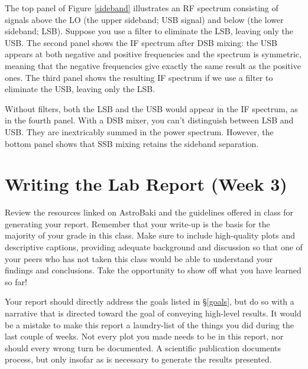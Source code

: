\documentclass[11pt,preprint]{aastex}
\begin{document}
%
%
%
The top panel of Figure \ref{sideband} illustrates an
RF spectrum consisting of signals above the LO (the upper
sideband; USB
signal) and below (the lower sideband; LSB). Suppose you use a filter to
eliminate the LSB, leaving only the USB. The second panel
shows the IF spectrum after DSB mixing: the USB appears at both negative
and positive frequencies and the spectrum is symmetric, meaning that the
negative frequencies give exactly the same result as the positive ones.
The third panel shows the resulting IF spectrum if we use a filter to eliminate the USB, leaving only the LSB.

Without filters, both the LSB and the USB
would appear in the IF spectrum, as in the fourth panel. 
With a DSB mixer, you can't distinguish between LSB and
USB. They are inextricably
summed in the power spectrum.
However, the bottom panel shows that SSB 
mixing retains the sideband separation.

\section{Writing the Lab Report (Week 3)} \label{report}

\noindent
Review the resources linked on AstroBaki and the guidelines
offered in class for generating your report. Remember that your write-up
is the basis for the majority of your grade in this class. Make sure to
include high-quality plots and descriptive captions, providing adequate background
and discussion so that one of your peers who has not taken this class would
be able to understand your findings and conclusions. Take the opportunity to
show off what you have learned so far!

Your report should directly address the goals listed in \S\ref{goals}, but
do so with a narrative that is directed toward the goal
of conveying high-level results.  It would be a mistake to make this report a
laundry-list of the things you did during the last couple of weeks. Not every
plot you made needs to be in this report, nor should every wrong turn be documented.
A scientific publication documents process, but only insofar as is necessary
to generate the results presented.
\end{document}
